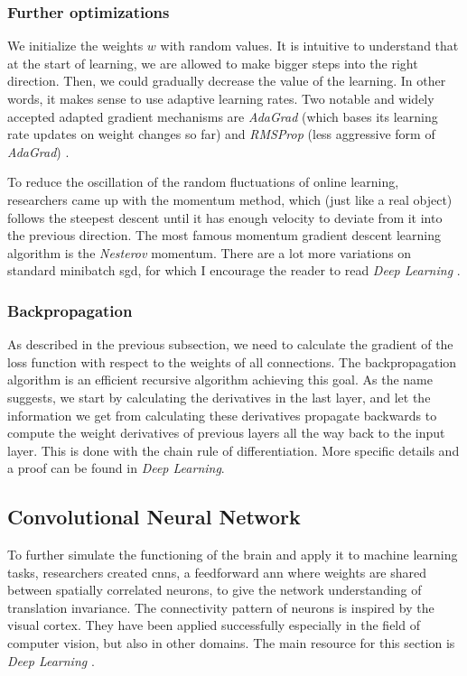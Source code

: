 \subsubsection*{Further optimizations}

We initialize the weights $w$ with random values. It is intuitive to understand that at the start of learning, we are allowed to make bigger steps into the right direction. Then, we could gradually decrease the value of the learning. In other words, it makes sense to use adaptive learning rates. Two notable and widely accepted adapted gradient mechanisms are \textit{AdaGrad} (which bases its learning rate updates on weight changes so far) and \textit{RMSProp} (less aggressive form of \textit{AdaGrad}) \cite{duchi11,sutskever12}.

To reduce the oscillation of the random fluctuations of online learning, researchers came up with the momentum method, which (just like a real object) follows the steepest descent until it has enough velocity to deviate from it into the previous direction. The most famous momentum gradient descent learning algorithm is the \textit{Nesterov} momentum. There are a lot more variations on standard minibatch \gls{sgd}, for which I encourage the reader to read \textit{Deep Learning} \cite{Goodfellow-et-al-2016}.

\subsubsection*{Backpropagation}
As described in the previous subsection, we need to calculate the gradient of the loss function with respect to the weights of all connections. The backpropagation algorithm is an efficient recursive algorithm achieving this goal. As the name suggests, we start by calculating the derivatives in the last layer, and let the information we get from calculating these derivatives propagate backwards to compute the weight derivatives of previous layers all the way back to the input layer. This is done with the chain rule of differentiation. More specific details and a proof can be found in \textit{Deep Learning}.\\

\subsection{Convolutional Neural Network}
\label{subsubsec:cnn}
To further simulate the functioning of the brain and apply it to machine learning tasks, researchers created \acrlong{cnn}s, a feedforward \gls{ann} where weights are shared between spatially correlated neurons, to give the network understanding of translation invariance. The connectivity pattern of neurons is inspired by the visual cortex. They have been applied successfully especially in the field of computer vision, but also in other domains. The main resource for this section is \textit{Deep Learning} \cite{Goodfellow-et-al-2016}.\\

